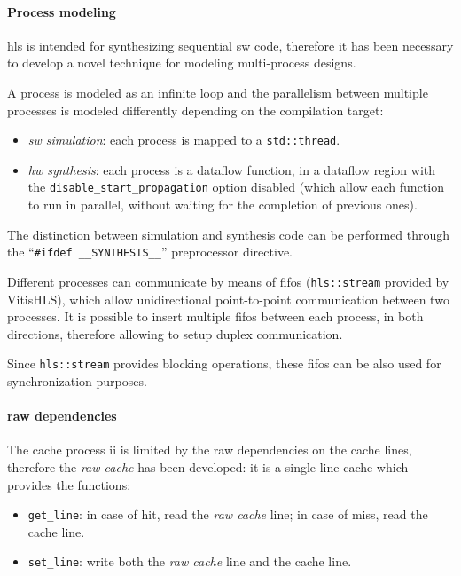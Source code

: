 \documentclass[11pt,a4paper,oneside]{memoir}
\begin{document}
\paragraph{Process modeling}
\ac{hls} is intended for synthesizing sequential \acl{sw} code, therefore it has
been necessary to develop a novel technique for modeling multi-process designs.

A process is modeled as an infinite loop and the parallelism between multiple
processes is modeled differently depending on the compilation target:
\begin{itemize}
	\item \emph{\ac{sw} simulation}: each process is mapped to a
		\texttt{std::thread}.
	\item \emph{\ac{hw} synthesis}: each process is a dataflow function, in
		a dataflow region with the \texttt{disable\_start\_propagation}
		option disabled (which allow each function to run in parallel,
		without waiting for the completion of previous ones).
\end{itemize}
The distinction between simulation and synthesis code can be performed through
the ``\texttt{\#ifdef \_\_SYNTHESIS\_\_}'' preprocessor directive.

Different processes can communicate by means of \acp{fifo} (\texttt{hls::stream}
provided by Vitis\texttrademark HLS), which allow unidirectional point-to-point
communication between two processes. It is possible to insert multiple
\acp{fifo} between each process, in both directions, therefore allowing to
setup duplex communication.

Since \texttt{hls::stream} provides blocking operations, these \acp{fifo} can
be also used for synchronization purposes.

\paragraph{\acl{raw} dependencies}
The cache process \ac{ii} is limited by the \ac{raw} dependencies on the cache
lines, therefore the \emph{\ac{raw} cache} has been developed: it is a
single-line cache which provides the functions:
\begin{itemize}
	\item \texttt{get\_line}: in case of hit, read the \emph{\ac{raw}
		cache} line; in case of miss, read the cache line.
	\item \texttt{set\_line}: write both the \emph{\ac{raw} cache} line and
		the cache line.
\end{itemize}
\end{document}
